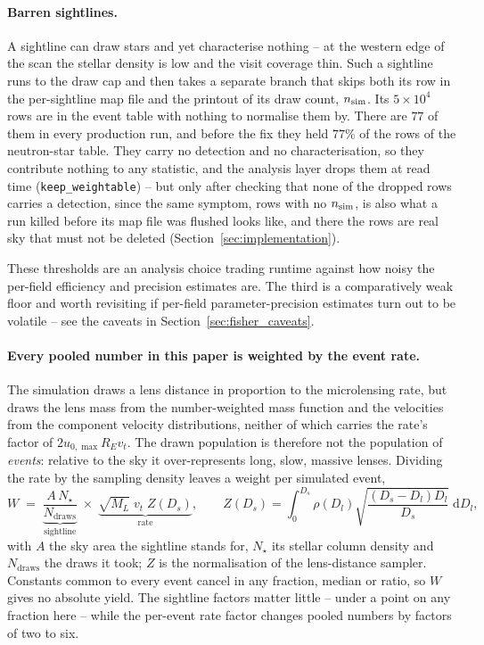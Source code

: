 \documentclass[english,10pt,a4paper]{article}
\begin{document}
	\paragraph{Barren sightlines.} A sightline can draw stars and yet characterise nothing -- at the western edge of the scan the stellar density is low and the visit coverage thin. Such a sightline runs to the draw cap and then takes a separate branch that skips both its row in the per-sightline map file and the printout of its draw count, $n_{\rm sim}$. Its $5\times10^4$ rows are in the event table with nothing to normalise them by. There are $77$ of them in every production run, and before the fix they held $77\%$ of the rows of the neutron-star table. They carry no detection and no characterisation, so they contribute nothing to any statistic, and the analysis layer drops them at read time (\texttt{keep\_weightable}) -- but only after checking that none of the dropped rows carries a detection, since the same symptom, rows with no $n_{\rm sim}$, is also what a run killed before its map file was flushed looks like, and there the rows are real sky that must not be deleted (Section~\ref{sec:implementation}).

	These thresholds are an analysis choice trading runtime against how noisy the per-field efficiency and precision estimates are. The third is a comparatively weak floor and worth revisiting if per-field parameter-precision estimates turn out to be volatile -- see the caveats in Section~\ref{sec:fisher_caveats}.
	
	\paragraph{Every pooled number in this paper is weighted by the event rate.}\label{sec:weighting} The simulation draws a lens distance in proportion to the microlensing rate, but draws the lens mass from the number-weighted mass function and the velocities from the component velocity distributions, neither of which carries the rate's factor of $2u_{0,\max}R_E v_t$. The drawn population is therefore not the population of \emph{events}: relative to the sky it over-represents long, slow, massive lenses. Dividing the rate by the sampling density leaves a weight per simulated event,
	\begin{equation}
		W \;=\; \underbrace{\frac{A\,N_\star}{N_{\mathrm{draws}}}}_{\text{sightline}}\;\times\;\underbrace{\sqrt{M_L}\;v_t\;Z(D_s)}_{\text{rate}},
		\qquad
		Z(D_s)=\int_0^{D_s}\!\rho(D_l)\sqrt{\frac{(D_s-D_l)D_l}{D_s}}\;\mathrm{d}D_l ,
	\end{equation}
	with $A$ the sky area the sightline stands for, $N_\star$ its stellar column density and $N_{\mathrm{draws}}$ the draws it took; $Z$ is the normalisation of the lens-distance sampler. Constants common to every event cancel in any fraction, median or ratio, so $W$ gives no absolute yield. The sightline factors matter little -- under a point on any fraction here -- while the per-event rate factor changes pooled numbers by factors of two to six.
\end{document}
